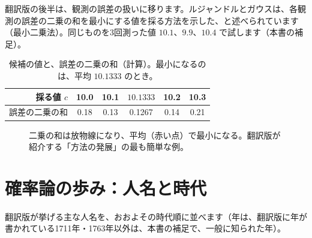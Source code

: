 \documentclass[a4paper,11pt,openany]{ltjsbook}
\begin{document}
翻訳版の後半は、観測の誤差の扱いに移ります。ルジャンドルとガウスは、各観測の誤差の二乗の和を最小にする値を採る方法を示した、と述べられています（最小二乗法）。同じものを3回測った値 $10.1$、$9.9$、$10.4$ で試します（本書の補足）。

\begin{table}[htbp]
\centering
\begin{tabular}{r|ccccc}
\toprule
採る値 $c$ & 10.0 & 10.1 & $10.1333$ & 10.2 & 10.3\\
\midrule
誤差の二乗の和 & 0.18 & 0.13 & 0.1267 & 0.14 & 0.21\\
\bottomrule
\end{tabular}
\caption{候補の値と、誤差の二乗の和（計算）。最小になるのは、平均 $10.1333$ のとき。}
\end{table}

\begin{figure}[htbp]
\centering
{}
\caption{二乗の和は放物線になり、平均（赤い点）で最小になる。翻訳版が紹介する「方法の発展」の最も簡単な例。}
\end{figure}

\section{確率論の歩み：人名と時代}

翻訳版が挙げる主な人名を、おおよその時代順に並べます（年は、翻訳版に年が書かれている1711年・1763年以外は、本書の補足で、一般に知られた年）。
\end{document}
